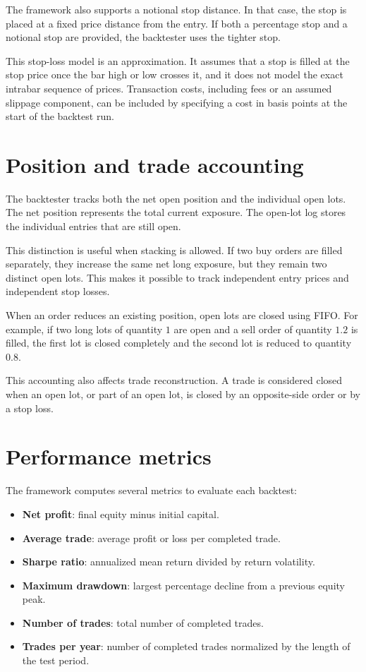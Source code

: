 The framework also supports a notional stop distance. In that case, the stop is placed at a fixed
price distance from the entry. If both a percentage stop and a notional stop are provided, the
backtester uses the tighter stop.

This stop-loss model is an approximation. It assumes that a stop is filled at the stop price once
the bar high or low crosses it, and it does not model the exact intrabar sequence of prices.
Transaction costs, including fees or an assumed slippage component, can be included by specifying a
cost in basis points at the start of the backtest run.

\section{Position and trade accounting}

The backtester tracks both the net open position and the individual open lots. The net position
represents the total current exposure. The open-lot log stores the individual entries that are still
open.

This distinction is useful when stacking is allowed. If two buy orders are filled separately, they
increase the same net long exposure, but they remain two distinct open lots. This makes it possible
to track independent entry prices and independent stop losses.

When an order reduces an existing position, open lots are closed using FIFO. For example, if two
long lots of quantity \(1\) are open and a sell order of quantity \(1.2\) is filled, the first lot
is closed completely and the second lot is reduced to quantity \(0.8\).

This accounting also affects trade reconstruction. A trade is considered closed when an open lot, or
part of an open lot, is closed by an opposite-side order or by a stop loss.

\section{Performance metrics}

The framework computes several metrics to evaluate each backtest:

\begin{itemize}
    \item \textbf{Net profit}: final equity minus initial capital.
    \item \textbf{Average trade}: average profit or loss per completed trade.
    \item \textbf{Sharpe ratio}: annualized mean return divided by return volatility.
    \item \textbf{Maximum drawdown}: largest percentage decline from a previous equity peak.
    \item \textbf{Number of trades}: total number of completed trades.
    \item \textbf{Trades per year}: number of completed trades normalized by the length of the test period.
\end{itemize}

